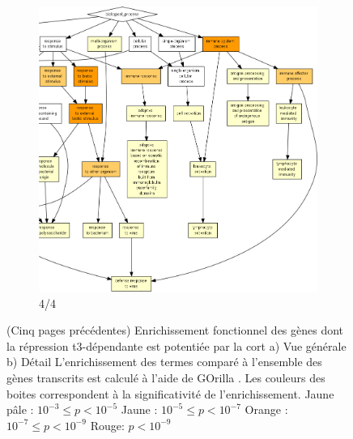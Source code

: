 \begin{figure}[!htp]
\ContinuedFloat
\begin{subfigure}{\textwidth}
\includegraphics[width=\textwidth]
{Figures/hlc-go-pot-down/hlc-go-pot-down_3.png}
\caption{4/4}
\end{subfigure}
\caption[Enrichissement fonctionnel des gènes dont la répression \gls{t3}-dépendante est potentiée par la \gls{cort}]
{
(Cinq pages précédentes) Enrichissement fonctionnel des gènes dont la répression \gls{t3}-dépendante est potentiée par la \gls{cort}
a) Vue générale
b) Détail
L'enrichissement des termes comparé à l'ensemble des gènes transcrits est calculé à l'aide de GOrilla \citep{Eden2009}.
Les couleurs des boites correspondent à la significativité de l'enrichissement.
Jaune pâle : $10^{-3} \leq p < 10^{-5}$
Jaune : $10^{-5} \leq p < 10^{-7}$
Orange : $10^{-7} \leq p < 10^{-9}$
Rouge: $p < 10^{-9}$
}
\label{fig:hlc-go-pot-down}
\end{figure}